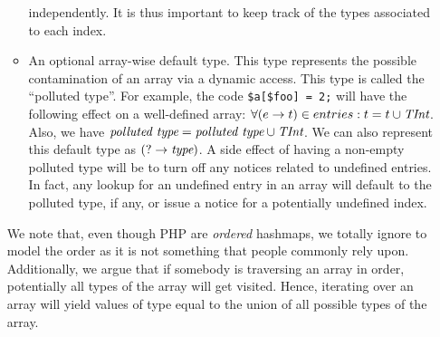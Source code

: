 \documentclass[a4paper]{article}
\begin{document}
\begin{itemize}
\begin{itemize}
          independently. It is thus important to keep track of the types
          associated to each index.
        \item An optional array-wise default type. This type represents the
          possible contamination of an array via a dynamic access. This type is
          called the ``polluted type''. For example, the code
          \verb/$a[$foo] = 2;/ will have the following effect on a well-defined
          array: $\forall (e \rightarrow t) \in entries: t = t \cup
          \emph{TInt}$. Also, we have $\emph{polluted type} = \emph{polluted
          type} \cup \emph{TInt}$. We can also represent this default type as
          $(? \rightarrow \emph{type})$. A side effect of having a non-empty
          polluted type will be to turn off any notices related to undefined
          entries. In fact, any lookup for an undefined entry in an array will
          default to the polluted type, if any, or issue a notice for a
          potentially undefined index.
    \end{itemize}
    We note that, even though PHP are \emph{ordered} hashmaps, we totally
    ignore to model the order as it is not something that people commonly rely
    upon. Additionally, we argue that if somebody is traversing an array in
    order, potentially all types of the array will get visited. Hence,
    iterating over an array will yield values of type equal to the union of all
    possible types of the array.


\end{itemize}
\end{document}
